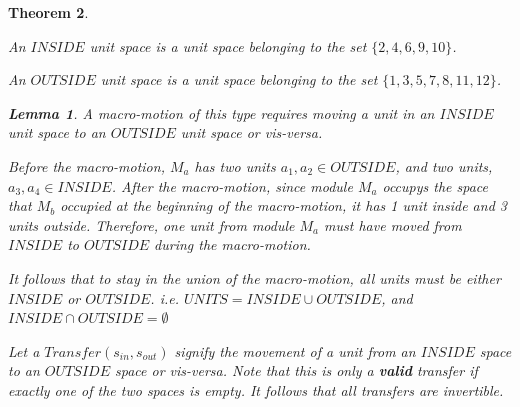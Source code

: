 \documentclass[12pt]{article}
\newtheorem{theorem}{Theorem}[section]
\newtheorem{lemma}[theorem]{Lemma}
\newenvironment{proof}[1][Proof]{\begin{trivlist}
\item[\hskip \labelsep {\bfseries #1}]}{\end{trivlist}}
\newenvironment{definition}[1][Definition]{\begin{trivlist}
\item[\hskip \labelsep {\bfseries #1}]}{\end{trivlist}}
\begin{document}
\begin{theorem}
\begin{definition} An $INSIDE$ unit space is a unit space belonging to the set $\{2,4,6,9,10\}$.
\end{definition}
\begin{definition} An $OUTSIDE$ unit space is a unit space belonging to the set $\{1,3,5,7,8,11,12\}$.
\end{definition}

\begin{lemma} A macro-motion of this type requires moving a unit in an $INSIDE$ unit space to an $OUTSIDE$ unit space or vis-versa.
  \begin{proof} 
    Before the macro-motion, $M_a$ has two units $a_1, a_2 \in OUTSIDE$, 
    and two units, $a_3, a_4 \in INSIDE$. After the macro-motion, since 
    module $M_a$ occupys the space that $M_b$ occupied at the 
    beginning of the macro-motion, it has 1 unit inside and 3 units 
    outside. Therefore, one unit from module $M_a$ must have moved 
    from $INSIDE$ to $OUTSIDE$ during the macro-motion. 
  \end{proof}
\end{lemma}
It follows that to stay in the union of the macro-motion, all units must be either $INSIDE$ or $OUTSIDE$. i.e. $UNITS = INSIDE \cup OUTSIDE$, and $INSIDE \cap OUTSIDE = \emptyset$

\begin{definition} Let a $Transfer(s_{in}, s_{out})$ signify the movement of a unit from an $INSIDE$ space to an $OUTSIDE$ space or vis-versa. Note that this is only a \textbf{valid} transfer if exactly one of the two spaces is empty. It follows that all transfers are invertible. 
\end{definition}


\end{theorem}
\end{document}
